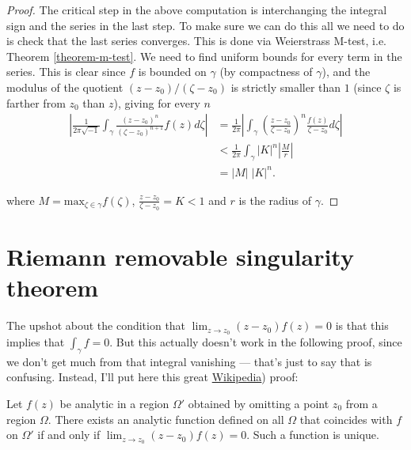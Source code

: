 \begin{proof}
\noindent
The critical step in the above computation
is interchanging the integral sign and the series in the last step.
To make sure we can do this all we need to do is check
that the last series converges.
This is done via Weierstrass M-test, i.e. Theorem \ref{theorem-m-test}.
We need to find uniform bounds for every term in the series.
This is clear since $f$ is bounded on $\gamma$ (by compactness of $\gamma$),
and the modulus of the quotient 
$(z-z_0)/(\zeta-z_0)$ is strictly smaller than $1$
(since $\zeta$ is farther from $z_0$ than $z$), giving
for every $n$
\begin{align*}
\left| \frac{1}{2\pi\sqrt{-1}}
\int_\gamma\frac{(z-z_0)^n}{(\zeta-z_0)^{n+1}}f(z)d\zeta\right| 
&=\frac{1}{2\pi}\left|
\int_\gamma\left(\frac{z-z_0}{\zeta-z_0}\right)^n\frac{f(z)}{\zeta-z_0}
d\zeta\right|\\
&< \frac{1}{2\pi}\int_\gamma |K|^n
\left|\frac{M}{r}\right|\\
&=|M|\;|K|^n.
\end{align*}

\noindent
where $M=\text{max}_{\zeta \in \gamma}f(\zeta)$, 
$\frac{z-z_0}{\zeta-z_0}=K<1$ and $r$ is the radius of $\gamma$.
\end{proof}
\section{Riemann removable singularity theorem}
\label{section-removable-singularity}

\noindent
The upshot about the condition that
$\lim_{z \to z_0} (z-z_0)f(z)=0$ is that this implies
that $\int_\gamma f=0$. But this actually doesn't
work in the following proof, since we don't get much from that
integral vanishing --- that's just to say that
\cite[Chapter 4, Theorem 7]{Ahlfors} is confusing.
Instead, I'll put here this great 
\href{https://en.wikipedia.org/wiki/Removable_singularity}{Wikipedia})
proof:

\begin{theorem}
\label{theorem-removable-singularity}
Let $f(z)$ be analytic in a region $\Omega'$ obtained by omitting a point $z_0$
from a region $\Omega$. There exists an analytic function  defined on all 
$\Omega$ that coincides with $f$ on $\Omega'$ if and only if 
$\lim_{z \to z_0} (z-z_0)f(z)=0$. Such a function is unique.
\end{theorem}

